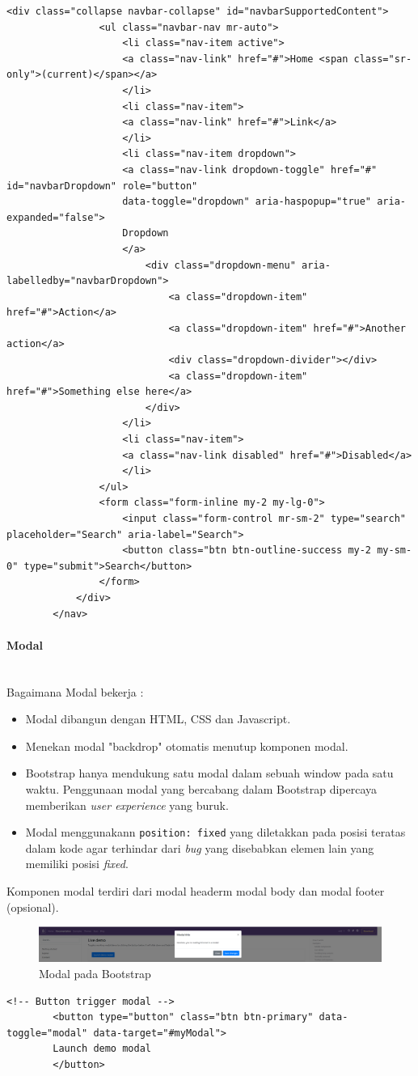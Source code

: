 \documentclass[a4paper,twoside]{article}
\newcommand{\myparagraph}[1]{\paragraph{#1}\mbox{}\\}
\begin{document}
\begin{enumerate}
\begin{lstlisting}[frame=single, basicstyle=\tiny]
			<div class="collapse navbar-collapse" id="navbarSupportedContent">
				<ul class="navbar-nav mr-auto">
					<li class="nav-item active">
					<a class="nav-link" href="#">Home <span class="sr-only">(current)</span></a>
					</li>
					<li class="nav-item">
					<a class="nav-link" href="#">Link</a>
					</li>
					<li class="nav-item dropdown">
					<a class="nav-link dropdown-toggle" href="#" id="navbarDropdown" role="button" 
					data-toggle="dropdown" aria-haspopup="true" aria-expanded="false">
					Dropdown
					</a>
						<div class="dropdown-menu" aria-labelledby="navbarDropdown">
							<a class="dropdown-item" href="#">Action</a>
							<a class="dropdown-item" href="#">Another action</a>
							<div class="dropdown-divider"></div>
							<a class="dropdown-item" href="#">Something else here</a>
						</div>
					</li>
					<li class="nav-item">
					<a class="nav-link disabled" href="#">Disabled</a>
					</li>
				</ul>
				<form class="form-inline my-2 my-lg-0">
					<input class="form-control mr-sm-2" type="search" placeholder="Search" aria-label="Search">
					<button class="btn btn-outline-success my-2 my-sm-0" type="submit">Search</button>
				</form>
			</div>
		</nav>
		\end{lstlisting}
		
		\myparagraph{Modal}
		Bagaimana Modal bekerja :
		\begin{itemize}
			\item Modal dibangun dengan HTML, CSS dan Javascript. 
			\item Menekan modal "backdrop" otomatis menutup komponen modal.
			\item Bootstrap hanya mendukung satu modal dalam sebuah window pada satu waktu. Penggunaan modal yang bercabang dalam Bootstrap dipercaya memberikan \textit{user experience} yang buruk.
			\item Modal menggunakann \texttt{position: fixed} yang diletakkan pada posisi teratas dalam kode agar terhindar dari \textit{bug} yang disebabkan elemen lain yang memiliki posisi \textit{fixed}. 
		\end{itemize}
		Komponen modal terdiri dari modal headerm modal body dan modal footer (opsional).
		\begin{figure} [H]
			\centering  
			\includegraphics[scale=0.5]{livemodal_bootstrap.png}  
			\caption{Modal pada Bootstrap} 
		\end{figure}
		\begin{lstlisting}[frame=single, basicstyle=\tiny] 
		<!-- Button trigger modal -->
		<button type="button" class="btn btn-primary" data-toggle="modal" data-target="#myModal">
		Launch demo modal
		</button>
		

\end{lstlisting}
\end{enumerate}
\end{document}
